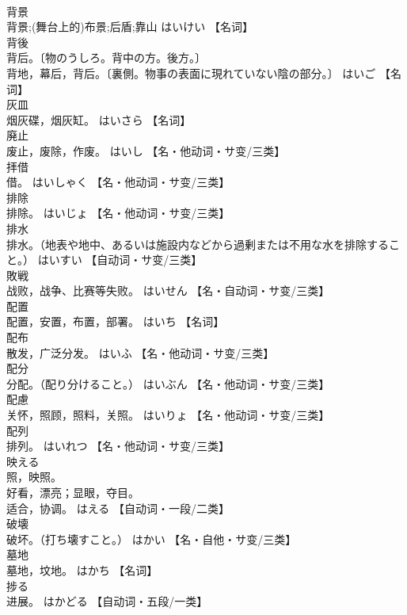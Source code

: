 \documentclass[8pt]{extreport}
\begin{document}
\begin{CJK}{UTF8}{min}
\\	背景	
\\	背景;(舞台上的)布景;后盾;靠山	はいけい		【名词】
\\	背後	
\\	背后。〔物のうしろ。背中の方。後方。〕 
\\	背地，幕后，背后。〔裏側。物事の表面に現れていない陰の部分。〕	はいご		【名词】
\\	灰皿	
\\	烟灰碟，烟灰缸。	はいさら		【名词】
\\	廃止	
\\	废止，废除，作废。	はいし		【名・他动词・サ变/三类】
\\	拝借	
\\	借。	はいしゃく		【名・他动词・サ变/三类】
\\	排除	
\\	排除。	はいじょ		【名・他动词・サ变/三类】
\\	排水	
\\	排水。（地表や地中、あるいは施設内などから過剰または不用な水を排除すること。）	はいすい		【自动词・サ变/三类】
\\	敗戦	
\\	战败，战争、比赛等失败。	はいせん		【名・自动词・サ变/三类】
\\	配置	
\\	配置，安置，布置，部署。	はいち		【名词】
\\	配布	
\\	散发，广泛分发。	はいふ		【名・他动词・サ变/三类】
\\	配分	
\\	分配。（配り分けること。）	はいぶん		【名・他动词・サ变/三类】
\\	配慮	
\\	关怀，照顾，照料，关照。	はいりょ		【名・他动词・サ变/三类】
\\	配列	
\\	排列。	はいれつ		【名・他动词・サ变/三类】
\\	映える	
\\	照，映照。 
\\	好看，漂亮；显眼，夺目。 
\\	适合，协调。	はえる		【自动词・一段/二类】
\\	破壊	
\\	破坏。（打ち壊すこと。）	はかい		【名・自他・サ变/三类】
\\	墓地	
\\	墓地，坟地。	はかち		【名词】
\\	捗る	
\\	进展。	はかどる		【自动词・五段/一类】

\end{CJK}
\end{document}
